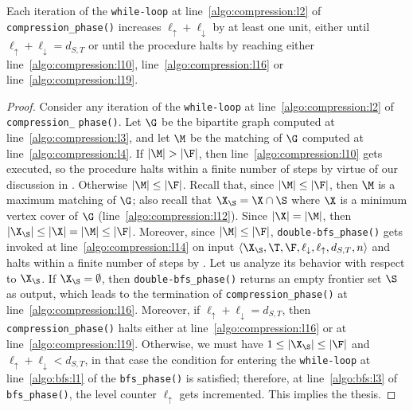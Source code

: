 \begin{lemma}\label{lemma:pre_halt_compression}
Each iteration of the \texttt{while-loop} at line~\ref{algo:compression:l2} of \texttt{compression\_phase()} increases
$\ell_\uparrow + \ell_\downarrow$ by at least one unit,
either until $\ell_\uparrow + \ell_\downarrow=d_{S,T}$ or until the procedure halts by reaching either
line~\ref{algo:compression:l10}, line~\ref{algo:compression:l16} or line~\ref{algo:compression:l19}.
\end{lemma}
\begin{proof} Consider any iteration of the \texttt{while-loop}
at line~\ref{algo:compression:l2} of \texttt{compression\_} \texttt{phase()}.
Let $\G$ be the bipartite graph computed at line~\ref{algo:compression:l3},
and let $\M$ be the matching of $\G$ computed at line~\ref{algo:compression:l4}.
If $|\M| > |\F|$, then line~\ref{algo:compression:l10} gets executed, so the procedure halts
within a finite number of steps by virtue of our discussion in .
Otherwise $|\M|\leq |\F|$. Recall that, since $|\M|\leq |\F|$, then $\M$ is a maximum matching of $\G$;
also recall that $\X_\S = \X\cap\S$ where $\X$ is a minimum vertex cover of $\G$ (line~\ref{algo:compression:l12}).
Since $|\X|=|\M|$, then $|\X_\S|\leq|\X|=|\M|\leq|\F|$.
Moreover, since $|\M| \leq |\F|$, \texttt{double-bfs\_phase()} gets invoked
at line~\ref{algo:compression:l14} on input $\langle \X_\S, \T, \F, \ell_\downarrow, \ell_\uparrow, d_{S,T}, n \rangle$
and
halts within a finite number of steps by .
Let us analyze its behavior with respect to $\X_\S$.
If $\X_\S=\emptyset$, then \texttt{double-bfs\_phase()} returns an empty frontier set $\S$ as output,
which leads to the termination of \texttt{compression\_phase()} at line~\ref{algo:compression:l16}.
Moreover, if $\ell_\uparrow + \ell_\downarrow=d_{S,T}$,
then
\texttt{compression\_phase()} halts
either at line~\ref{algo:compression:l16} or at line~\ref{algo:compression:l19}.
Otherwise, we must have $1 \leq |\X_\S|\leq |\F|$ and $\ell_\uparrow+\ell_\downarrow < d_{S,T}$,
in that case the condition for entering the
\texttt{while-loop} at line~\ref{algo:bfs:l1} of the \texttt{bfs\_phase()} is satisfied;
therefore, at line~\ref{algo:bfs:l3} of \texttt{bfs\_phase()}, the level counter $\ell_\uparrow$
gets incremented.
This implies the thesis.
\end{proof}

